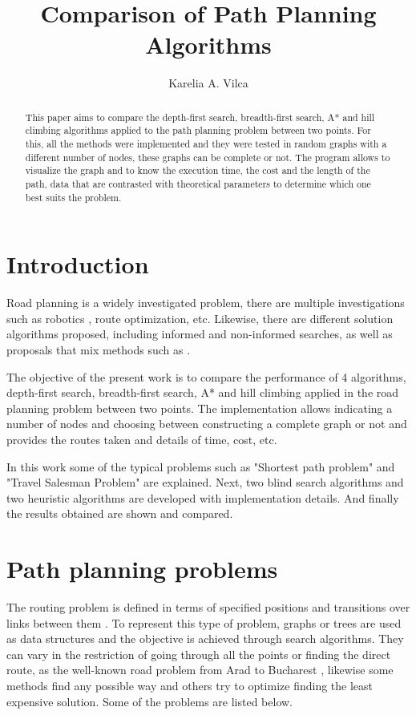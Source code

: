 \documentclass[11pt]{article}
\title{Comparison of Path Planning Algorithms\\ }
\author{Karelia A. Vilca\inst{1}}
\begin{document}
 


\maketitle

\begin{abstract}
This paper aims to compare the depth-first search, breadth-first search, A* and hill climbing algorithms applied to the path planning problem between two points. For this, all the methods were implemented and they were tested in random graphs with a different number of nodes, these graphs can be complete or not. The program allows to visualize the graph and to know the execution time, the cost and the length of the path, data that are contrasted with theoretical parameters to determine which one best suits the problem. 
\end{abstract}
\section{Introduction}
Road planning is a widely investigated problem, there are multiple investigations such as robotics \cite{shwail2013probabilistic}, route optimization, etc. Likewise, there are different solution algorithms proposed, including informed and non-informed searches, as well as proposals that mix methods such as \cite{felner2003kbfs}.

The objective of the present work is to compare the performance of 4 algorithms, depth-first search, breadth-first search, A* and hill climbing applied in the road planning problem between two points. The implementation allows indicating a number of nodes and choosing between constructing a complete graph or not and provides the routes taken and details of time, cost, etc.

In this work some of the typical problems such as "Shortest path problem" and "Travel Salesman Problem" are explained. Next, two blind search algorithms and two heuristic algorithms are developed with implementation details. And finally the results obtained are shown and compared.

\section{Path planning problems}
The routing problem is defined in terms of specified positions and transitions over links between them \cite{russell2004inteligencia}. 
To represent this type of problem, graphs or trees are used as data structures and the objective is achieved through search algorithms.
They can vary in the restriction of going through all the points or finding the direct route, as the well-known road problem from Arad to Bucharest \cite{russell2004inteligencia}, likewise some methods find any possible way and others try to optimize finding the least expensive solution. Some of the problems are listed below.
\end{document}
